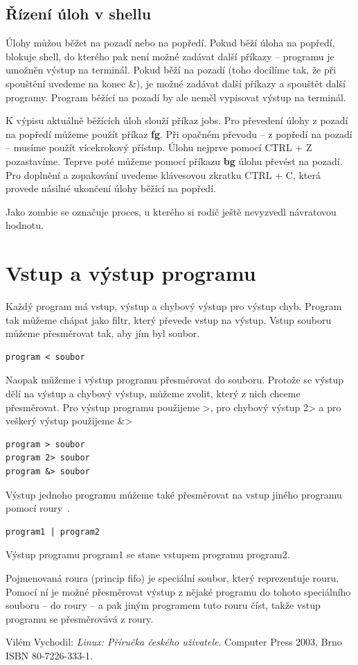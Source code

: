\documentclass{article}
\begin{document}
\subsection{Řízení úloh v shellu}
Úlohy můžou běžet na pozadí nebo na popředí. Pokud běží úloha na popředí, blokuje shell, do kterého pak není možné zadávat další příkazy -- programu je umožněn výstup na terminál. Pokud běží na pozadí (toho docílíme tak, že při spouštění uvedeme na konec \&), je možné zadávat další příkazy a spouštět další programy. Program běžící na pozadí by ale neměl vypisovat výstup na terminál.

K výpisu aktuálně běžících úloh slouží příkaz jobs. Pro převedení úlohy z pozadí na popředí můžeme použít příkaz \textbf{fg}. Při opačném převodu -- z popředí na pozadí -- musíme použít vícekrokový přístup. Úlohu nejprve pomocí CTRL + Z pozastavíme. Teprve poté můžeme pomocí příkazu \textbf{bg} úlohu převést na pozadí. Pro doplnění a zopakování uvedeme klávesovou zkratku CTRL + C, která provede násilné ukončení úlohy běžící na popředí.	

Jako zombie se označuje proces, u kterého si rodič ještě nevyzvedl návratovou hodnotu.

\section{Vstup a výstup programu}
Každý program má vstup, výstup a chybový výstup pro výstup chyb. Program tak můžeme chápat jako filtr, který převede vstup na výstup. Vstup souboru můžeme přesměrovat tak, aby jím byl soubor.
\begin{verbatim}
program < soubor
\end{verbatim}

Naopak můžeme i výstup programu přesměrovat do souboru. Protože se výstup dělí na výstup a chybový výstup, můžeme zvolit, který z nich chceme přesměrovat. Pro výstup programu použijeme \textgreater, pro chybový výstup 2\textgreater{} a pro veškerý výstup použijeme \&\textgreater
\begin{verbatim}
program > soubor
program 2> soubor
program &> soubor
\end{verbatim}

Výstup jednoho programu můžeme také přesměrovat na vstup jiného programu pomocí roury~\textpipe. 
\begin{verbatim}
program1 | program2
\end{verbatim} 
Výstup programu program1 se stane vstupem programu program2.

Pojmenovaná roura (princip fifo) je speciální soubor, který reprezentuje rouru. Pomocí ní je možné přesměrovat výstup z nějaké programu do tohoto speciálního souboru -- do roury -- a pak jiným programem tuto rouru číst, takže vstup programu se přesměrovává z roury.

\newpage
\begin{thebibliography}{0}
   Vilém Vychodil:
    \emph{Linux: Příručka českého uživatele}. Computer Press 2003, Brno ISBN 80-7226-333-1. 
\end{thebibliography}
\end{document}
